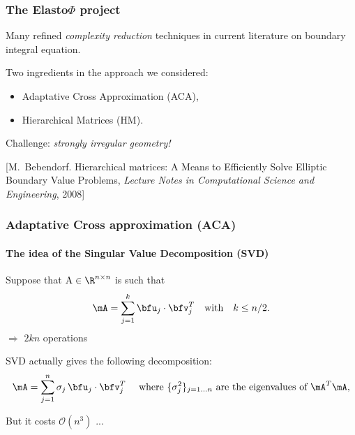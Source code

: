 \begin{frame}
\frametitle{The Elasto$\Phi$ project} 

Many refined \emph{complexity reduction} techniques in current literature on boundary integral equation.

\bigskip
Two ingredients in the approach we considered: 
\begin{itemize}
\item
Adaptative Cross Approximation (\alert{ACA}),
\item
Hierarchical Matrices (\alert{HM}).
\end{itemize}

\medskip
Challenge: \emph{strongly irregular geometry!}

\bigskip
\bigskip

{\tiny
[M.~Bebendorf. Hierarchical matrices: A Means to Efficiently Solve Elliptic Boundary Value Problems, {\em Lecture Notes in Computational Science and Engineering}, 2008]



\par} %

\end{frame}


\begin{frame}
\frametitle{Adaptative Cross approximation (ACA)}
\framesubtitle{The idea of the Singular Value Decomposition (SVD)} 
Suppose that $\mathrm{A} \in \R^{n\times n}$ is such that 
\[
\mA = \sum_{j=1}^{k}\bfu_{j}\cdot\bfv_{j}^{T}\quad \text{with}\quad k\leq n/2.
\]
$\Rightarrow$ $2kn$ operations

\bigskip
SVD actually gives the following decomposition:
\begin{equation*}\label{SVD}
\mA = \sum_{j=1}^{n}\sigma_{j}\,\bfu_{j}\cdot\bfv_{j}^{T}\quad \text{ where }\{\sigma_{j}^{2}\}_{j=1\dots n} \text{ are the eigenvalues of } \mA^{T}\mA,
\end{equation*}

But it costs $\mathcal{O}(n^{3})$ ...

\end{frame}

